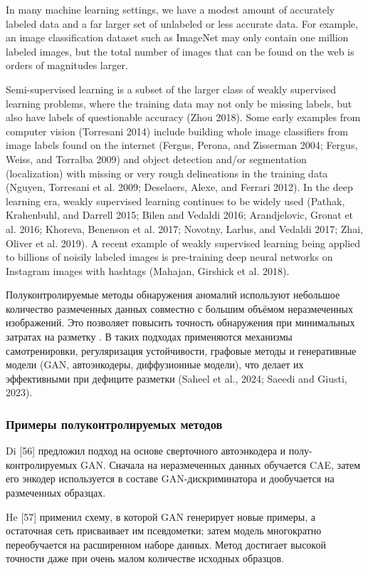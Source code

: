 \documentclass[14pt,a4paper]{article}
\begin{document}
In many machine learning settings, we have a modest amount of accurately labeled data and a far larger set of unlabeled or less accurate data. For example, an image classification dataset such as ImageNet may only contain one million labeled images, but the total number of images that can be found on the web is orders of magnitudes larger. 

Semi-supervised learning is a subset of the larger class of weakly supervised learning problems, where the training data may not only be missing labels, but also have labels of questionable accuracy (Zhou 2018). Some early examples from computer vision (Torresani 2014) include building whole image classifiers from image labels found on the internet (Fergus, Perona, and Zisserman 2004; Fergus, Weiss, and Torralba 2009) and object detection and/or segmentation (localization) with missing or very rough delineations in the training data (Nguyen, Torresani et al. 2009; Deselaers, Alexe, and Ferrari 2012). In the deep learning era, weakly supervised learning continues to be widely used (Pathak, Krahenbuhl, and Darrell 2015; Bilen and Vedaldi 2016; Arandjelovic, Gronat et al. 2016; Khoreva, Benenson et al. 2017; Novotny, Larlus, and Vedaldi 2017; Zhai, Oliver et al. 2019). A recent example of weakly supervised learning being applied to billions of noisily labeled images is pre-training deep neural networks on Instagram images with hashtags (Mahajan, Girshick et al. 2018).\cite{Szeliski2022}

Полуконтролируемые методы обнаружения аномалий используют небольшое количество размеченных данных совместно с большим объёмом неразмеченных изображений. Это позволяет повысить точность обнаружения при минимальных затратах на разметку \cite{Shukla2025}. В таких подходах применяются механизмы самотренировки, регуляризация устойчивости, графовые методы и генеративные модели (GAN, автоэнкодеры, диффузионные модели), что делает их эффективными при дефиците разметки (Saheel et al., 2024; Saeedi and Giusti, 2023).

\subsubsection*{Примеры полуконтролируемых методов}
Di [56] предложил подход на основе сверточного автоэнкодера и полу-контролируемых GAN. Сначала на неразмеченных данных обучается CAE, затем его энкодер используется в составе GAN-дискриминатора и дообучается на размеченных образцах.

He [57] применил схему, в которой GAN генерирует новые примеры, а остаточная сеть присваивает им псевдометки; затем модель многократно переобучается на расширенном наборе данных. Метод достигает высокой точности даже при очень малом количестве исходных образцов.
\end{document}
